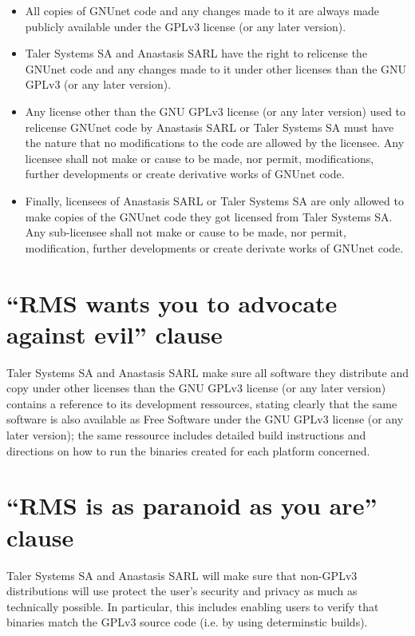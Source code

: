 \documentclass[12pt, a4paper, bibliography=totocnumbered]{article}
\begin{document}
\begin{itemize}
\item All copies of GNUnet code and any changes made to it are always made publicly available under the GPLv3 license (or any later version).
\item Taler Systems SA and Anastasis SARL have the right to relicense the GNUnet code and any changes made to it under other licenses than the GNU GPLv3 (or any later version).
\item Any license other than the GNU GPLv3 license (or any later version) used to relicense GNUnet code by Anastasis SARL or Taler Systems SA must have the nature that no modifications to the code are allowed by the licensee. Any licensee shall not make or cause to be made, nor permit, modifications, further developments or create derivative works of GNUnet code.
\item Finally, licensees of Anastasis SARL or Taler Systems SA are only allowed to make copies of the GNUnet code they got licensed from Taler Systems SA. Any sub-licensee shall not make or cause to be made, nor permit, modification, further developments or create derivate works of GNUnet code.
\end{itemize}

\section*{``RMS wants you to advocate against evil'' clause}

Taler Systems SA and Anastasis SARL make sure all software they
distribute and copy under other licenses than the GNU GPLv3 license
(or any later version) contains a reference to its development
ressources, stating clearly that the same software is also available
as Free Software under the GNU GPLv3 license (or any later version);
the same ressource includes detailed build instructions and directions
on how to run the binaries created for each platform concerned.

\section*{``RMS is as paranoid as you are'' clause}

Taler Systems SA and Anastasis SARL will make sure that non-GPLv3
distributions will use protect the user's security and privacy as much
as technically possible.  In particular, this includes enabling users
to verify that binaries match the GPLv3 source code (i.e. by using
determinstic builds).
\end{document}
